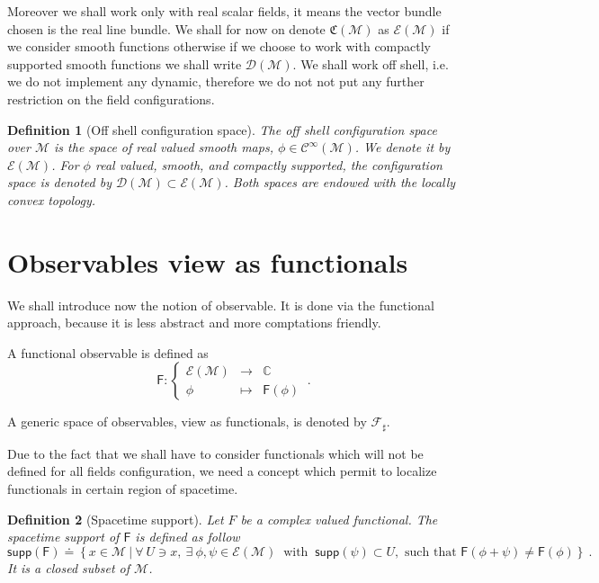 \documentclass[10pt]{book}
\newcommand{\supp}{\mathsf{supp}}
\newcommand{\Ccal}{\mathcal{C}}
\newcommand{\Dcal}{\mathcal{D}}
\newcommand{\Ecal}{\mathcal{E}}
\newcommand{\Fcal}{\mathcal{F}}
\newcommand{\Mcal}{\mathcal{M}}
\newcommand{\Cbb}{\mathbb{C}}
\newcommand{\Crak}{\mathfrak{C}}
\newcommand{\Fsf}{\mathsf{F}}
\theoremstyle{break}
\newtheorem{definition}{Definition}
\begin{document}
\bigskip


Moreover  we shall work only with real scalar  fields, it means the vector bundle chosen is the real line bundle. We shall for now on denote $\Crak(\Mcal)$ as $\Ecal(\Mcal)$ if we consider smooth functions otherwise if we choose to work with compactly supported smooth functions we  shall write $\Dcal(\Mcal)$. We shall work off shell, i.e. we do not implement any dynamic, therefore we do not not put any further restriction on the field configurations.


\begin{definition}[Off shell configuration space]
The off shell configuration space over $\Mcal$ is the space of real valued smooth maps, $\phi \in \Ccal^\infty(\Mcal)$. We denote it by $\Ecal(\Mcal)$. For $\phi$ real valued, smooth, and compactly supported, the configuration space is denoted by $\Dcal(\Mcal) \subset \Ecal(\Mcal)$. Both spaces are endowed with the locally convex topology.
\end{definition}


\section{Observables view as functionals}


We shall introduce now the notion of observable. It is done via the functional approach, because it is less abstract and more comptations friendly.


\bigskip

A functional observable is defined as 
%
\begin{equation*}
\Fsf : \left\{
\begin{array}{ccc}
\Ecal(\Mcal) & \to     & \Cbb \\
\phi  & \mapsto & \Fsf(\phi)
\end{array}
\right. \ . 
\end{equation*}

A generic space of observables, view as functionals, is denoted by $\Fcal_\sharp$.


\bigskip


Due to the fact that we shall have to consider functionals which will not be defined for all fields configuration, we need a concept which permit to localize functionals in certain region of spacetime.


\begin{definition}[Spacetime support] \label{def:spacetime-supp}
Let $F$ be a complex valued functional. The spacetime support of $\Fsf$ is defined as follow
%
\begin{equation*}
\supp(\Fsf) \doteq \left\{ x \in \Mcal \ \bigg| \ 
\forall \ U \ni x , \ \exists \ \phi, \psi \in \Ecal(\Mcal) \ \mbox{ with } \ \supp(\psi) \subset U, \mbox{ such that } \Fsf(\phi + \psi) \neq \Fsf(\phi)
\right\} \ .
\end{equation*}
It is a closed subset of $\Mcal$.
%
\end{definition}
\end{document}
